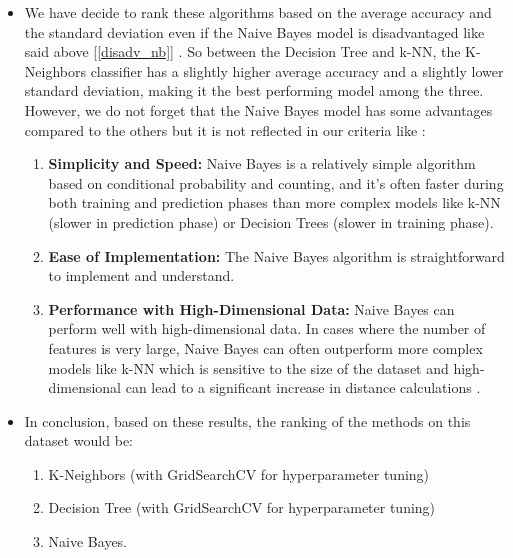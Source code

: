 \documentclass[acmconf,nonacm=true]{acmart}
\begin{document}
\begin{enumerate}
\begin{itemize}
        \item 
        We have decide to rank these algorithms based on the average accuracy and the standard deviation even if the Naive Bayes model is disadvantaged like said above [\ref{disadv_nb}] . So between the Decision Tree and k-NN, the K-Neighbors classifier has a slightly higher average accuracy and a slightly lower standard deviation, making it the best performing model among the three. \\
        However, we do not forget that the Naive Bayes model has some advantages compared to the others but it is not reflected in our criteria like :
        \begin{enumerate}
            \item 
            \textbf{Simplicity and Speed:} Naive Bayes is a relatively simple algorithm based on conditional probability and counting, and it’s often faster during both training and prediction phases than more complex models like k-NN (slower in prediction phase) or Decision Trees (slower in training phase).

            \item 
            \textbf{Ease of Implementation:} The Naive Bayes algorithm is straightforward to implement and understand.

            \item 
            \textbf{Performance with High-Dimensional Data:} Naive Bayes can perform well with high-dimensional data. In cases where the number of features is very large, Naive Bayes can often outperform more complex models like k-NN which is sensitive to the size of the dataset and high-dimensional  can lead to a significant increase in distance calculations .
        \end{enumerate}
        
        
        \item 
        In conclusion, based on these results, the ranking of the methods on this dataset would be:
        
        
        \begin{enumerate}[label=\arabic*)]
            \item 
            K-Neighbors (with GridSearchCV for hyperparameter tuning)
            
            \item 
            Decision Tree (with GridSearchCV for hyperparameter tuning)
            
            \item 
            Naive Bayes.
    
        \end{enumerate}
        
    \end{itemize}
    
\end{enumerate}
\end{document}
